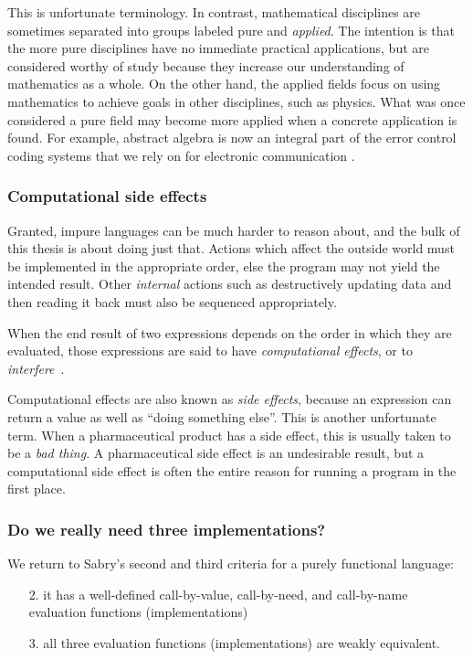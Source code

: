 This is unfortunate terminology. In contrast, mathematical disciplines are sometimes separated into groups labeled pure and \emph{applied}. The intention is that the more pure disciplines have no immediate practical applications, but are considered worthy of study because they increase our understanding of mathematics as a whole. On the other hand, the applied fields focus on using mathematics to achieve goals in other disciplines, such as physics. What was once considered a pure field may become more applied when a concrete application is found. For example, abstract algebra is now an integral part of the error control coding systems that we rely on for electronic communication \cite{lin:error-control-coding}.

\subsubsection{Computational side effects}
Granted, impure languages can be much harder to reason about, and the bulk of this thesis is about doing just that. Actions which affect the outside world must be implemented in the appropriate order, else the program may not yield the intended result. Other \emph{internal} actions such as destructively updating data and then reading it back must also be sequenced appropriately. 

When the end result of two expressions depends on the order in which they are evaluated, those expressions are said to have \emph{computational effects}, or to \emph{interfere}~\cite{reynolds:interference}.

Computational effects are also known as \emph{side effects}, because an expression can return a value as well as ``doing something else''. This is another unfortunate term. When a pharmaceutical product has a side effect, this is usually taken to be a \emph{bad thing}. A pharmaceutical side effect is an undesirable result, but a computational side effect is often the entire reason for running a program in the first place. 

\subsubsection{Do we really need three implementations?}

We return to Sabry's second and third criteria for a purely functional language:
\begin{enumerate}
\item[2. ]	
	it has a well-defined call-by-value, call-by-need, and call-by-name evaluation
	functions (implementations)

\item[3. ]
	all three evaluation functions (implementations) are weakly equivalent.
\end{enumerate}

